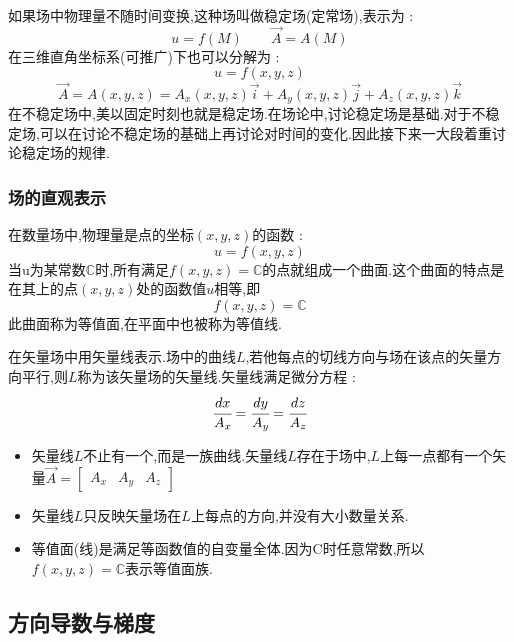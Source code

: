 \documentclass[UTF8,12pt]{ctexbook}
\newcommand{\defFunction}[1]{f(#1)}
\newcommand{\mathConstant}{\mathbb{C}}
\begin{document}
{{{{      如果场中物理量不随时间变换,这种场叫做稳定场(定常场),表示为 :
      $$
        u= \defFunction{M}\qquad \vec{A} = A(M)
      $$
      在三维直角坐标系(可推广)下也可以分解为 :
      $$
        u= \defFunction{x,y,z}
      $$
      $$
        \vec{A} = A(x,y,z) = A_x(x,y,z)\vec{i} + A_y(x,y,z)\vec{j} + A_z(x,y,z)\vec{k}
      $$
      在不稳定场中,美以固定时刻也就是稳定场.在场论中,讨论稳定场是基础.对于不稳定场,可以在讨论不稳定场的基础上再讨论对时间的变化.因此接下来一大段着重讨论稳定场的规律.
    }%

    \subsubsection{场的直观表示}{
      在数量场中,物理量是点的坐标$(x,y,z)$的函数 :
      $$
        u = \defFunction{x,y,z}
      $$
      当u为某常数$\mathConstant$时,所有满足$\defFunction{x,y,z} = \mathConstant$的点就组成一个曲面.这个曲面的特点是在其上的点$(x,y,z)$处的函数值$u$相等,即
      $$
        \defFunction{x,y,z} = \mathConstant
      $$
      此曲面称为等值面,在平面中也被称为等值线.

      在矢量场中用矢量线表示.场中的曲线$L$,若他每点的切线方向与场在该点的矢量方向平行,则$L$称为该矢量场的矢量线.矢量线满足微分方程 :
      $$
        \cfrac{dx}{A_x} = \cfrac{dy}{A_y} = \cfrac{dz}{A_z}
      $$

      \begin{itemize}
        \item 矢量线$L$不止有一个,而是一族曲线.矢量线$L$存在于场中,$L$上每一点都有一个矢量$\vec{A} = \begin{bmatrix}
                  A_x & A_y & A_z
                \end{bmatrix}$
        \item 矢量线$L$只反映矢量场在$L$上每点的方向,并没有大小数量关系.
        \item 等值面(线)是满足等函数值的自变量全体.因为C时任意常数,所以$\defFunction{x,y,z} = \mathConstant$表示等值面族.
      \end{itemize}
    }%

  }%

  \subsection{方向导数与梯度}{

}}}
\end{document}
